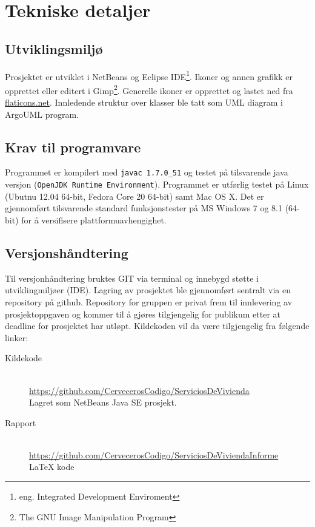 \section{Tekniske detaljer}

\subsection{Utviklingsmiljø} \label{subssec:utvmiljo}
Prosjektet er utviklet i NetBeans og Eclipse IDE\footnote{eng. Integrated Development Enviroment}. Ikoner og annen grafikk er opprettet eller editert i Gimp\footnote{The GNU Image Manipulation Program}. Generelle ikoner er opprettet og lastet ned fra \href{http://www.flaticons.net}{flaticons.net}. Innledende struktur over klasser ble tatt som UML diagram i ArgoUML program.

\subsection{Krav til programvare}
Programmet er kompilert med \texttt{javac 1.7.0\_51} og testet på tilsvarende java versjon (\texttt{OpenJDK Runtime Environment}). Programmet er utførlig testet på Linux (Ubutnu 12.04 64-bit, Fedora Core 20 64-bit) samt Mac OS X. Det er gjennomført tilsvarende standard funksjonstester på MS Windows 7 og 8.1 (64-bit) for å versifisere plattformuavhengighet. 

\subsection{Versjonshåndtering}
Til versjonhåndtering bruktes GIT via terminal og innebygd støtte i utviklingmiljøer (IDE). Lagring av prosjektet ble gjennomført sentralt via en repository på github. Repository for gruppen er privat frem til innlevering av prosjektoppgaven og kommer til å gjøres tilgjengelig for publikum etter at deadline for prosjektet har utløpt. Kildekoden vil da være tilgjengelig fra følgende linker:

\begin{description}
\item[Kildekode]
\hfill \\
\url{https://github.com/CervecerosCodigo/ServiciosDeVivienda}
\\Lagret som NetBeans Java SE prosjekt.

\item[Rapport]
\hfill \\
\url{https://github.com/CervecerosCodigo/ServiciosDeViviendaInforme}
\\ \LaTeX{} kode
\end{description}